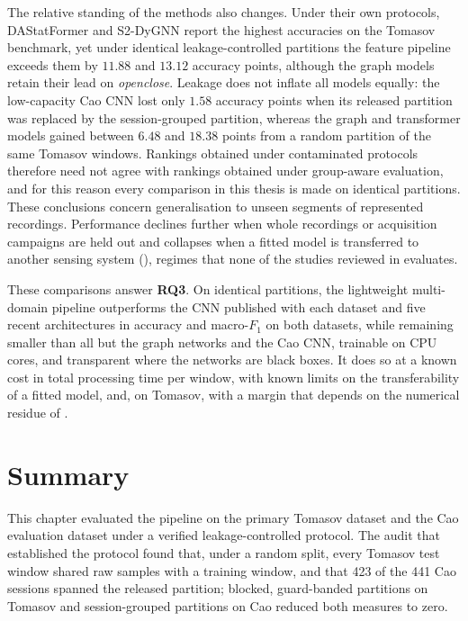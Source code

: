 The relative standing of the methods also changes. Under their own protocols, DAStatFormer and S2-DyGNN report the highest accuracies on the Tomasov benchmark, yet under identical leakage-controlled partitions the feature pipeline exceeds them by $11.88$ and $13.12$ accuracy points, although the graph models retain their lead on \emph{openclose}. Leakage does not inflate all models equally: the low-capacity Cao CNN lost only $1.58$ accuracy points when its released partition was replaced by the session-grouped partition, whereas the graph and transformer models gained between $6.48$ and $18.38$ points from a random partition of the same Tomasov windows. Rankings obtained under contaminated protocols therefore need not agree with rankings obtained under group-aware evaluation, and for this reason every comparison in this thesis is made on identical partitions. These conclusions concern generalisation to unseen segments of represented recordings. Performance declines further when whole recordings or acquisition campaigns are held out and collapses when a fitted model is transferred to another sensing system (), regimes that none of the studies reviewed in  evaluates.

These comparisons answer \textbf{RQ3}. On identical partitions, the lightweight multi-domain pipeline outperforms the CNN published with each dataset and five recent architectures in accuracy and macro-$F_1$ on both datasets, while remaining smaller than all but the graph networks and the Cao CNN, trainable on CPU cores, and transparent where the networks are black boxes. It does so at a known cost in total processing time per window, with known limits on the transferability of a fitted model, and, on Tomasov, with a margin that depends on the numerical residue of .

\section{Summary}%
\label{sec:chap4Summary}
This chapter evaluated the pipeline on the primary Tomasov dataset and the Cao evaluation dataset under a verified leakage-controlled protocol. The audit that established the protocol found that, under a random split, every Tomasov test window shared raw samples with a training window, and that 423 of the 441 Cao sessions spanned the released partition; blocked, guard-banded partitions on Tomasov and session-grouped partitions on Cao reduced both measures to zero.

